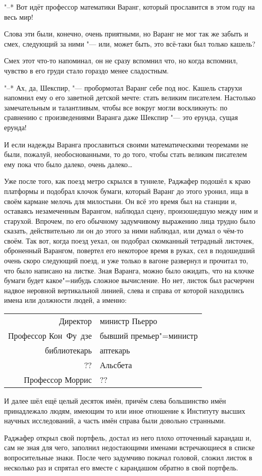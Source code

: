 "--* Вот идёт профессор математики Варанг, который прославится в этом году на
весь мир!

Слова эти были, конечно, очень приятными, но Варанг не мог так же забыть и смех,
следующий за ними "--- или, может быть, это всё-таки был только кашель?

Смех этот что-то напоминал, он не сразу вспомнил что, но когда вспомнил, чувство
в его груди стало гораздо менее сладостным.

"--* Ах, да, Шекспир, "--- пробормотал Варанг себе под нос.
Кашель старухи напомнил ему о его заветной детской мечте: стать великим
писателем.
Настолько замечательным и талантливым, чтобы все вокруг могли воскликнуть: по
сравнению с произведениями Варанга даже Шекспир "--- это ерунда, сущая ерунда!

И если надежды Варанга прославиться своими математическими теоремами не были,
пожалуй, необоснованными, то до того, чтобы стать великим писателем ему пока что
было далеко, очень далеко\ldots

Уже после того, как поезд метро скрылся в туннеле, Раджафер подошёл к краю
платформы и подобрал клочок бумаги, который Варанг до этого уронил, ища в своём
кармане мелочь для милостыни.
Он всё это время был на станции и, оставаясь незамеченным Варангом, наблюдал
сцену, произошедшую между ним и старухой.
Впрочем, по его обычному задумчивому выражению лица трудно было сказать,
действительно ли он до этого за ними наблюдал, или думал о чём-то своём.
Так вот, когда поезд уехал, он подобрал скомканный тетрадный листочек,
оброненный Варангом, повертел его некоторое время в руках, сел в подошедший
очень скоро следующий поезд, и уже только в вагоне развернул и прочитал то, что
было написано на листке.
Зная Варанга, можно было ожидать, что на клочке бумаги будет какое"=нибудь
сложное вычисление.
Но нет, листок был расчерчен надвое неровной вертикальной линией, слева и справа
от которой находились имена или должности людей, а именно:

\begin{table}[h!]
\centering
\begin{tabular}{r|l}
Директор             & министр Пьерро \\
Профессор Кон~Фу~дзе & бывший премьер"=министр \\
библиотекарь         & аптекарь \\
??                   & Альсбета \\
Профессор Моррис     & ?? \\
\end{tabular}
\end{table}

И далее шёл ещё целый десяток имён, причём слева большинство имён принадлежало
людям, имеющим то или иное отношение к Институту высших научных исследований, а
часть имён справа были довольно странными.

Раджафер открыл свой портфель, достал из него плохо отточенный карандаш и, сам не
зная для чего, заполнил недостающими именами встречающиеся в списке
вопросительные знаки.
После чего задумчиво покачал головой, сложил листок в несколько раз и спрятал
его вместе с карандашом обратно в свой портфель.
